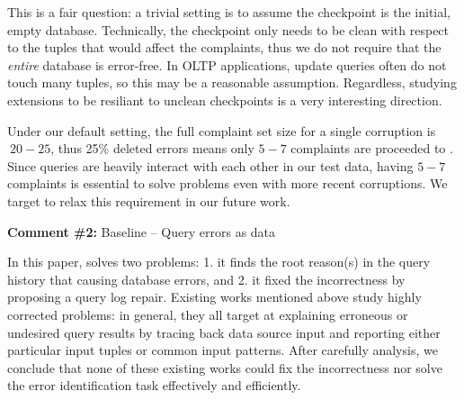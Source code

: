 \begin{quote}
\end{quote}
This is a fair question: a trivial setting is to assume the checkpoint is the initial, empty database.
Technically, the checkpoint only needs to be clean with respect to the tuples that would affect the complaints, thus we do not require that the {\it entire} database is error-free.  In OLTP applications, update queries often do not touch many tuples, so this may be a reasonable assumption.  
Regardless, studying extensions to be resiliant to unclean checkpoints is a very interesting direction.

\begin{quote}
\end{quote}

Under our default setting, the full complaint set size for a single corruption is $~20-25$, thus 
25\% deleted errors means only $5-7$ complaints are proceeded to \sys. Since queries
are heavily interact with each other in our test data, having $5-7$ complaints is essential 
to solve problems even with more recent corruptions. 
We target to relax this requirement in our future work.



\comskip

\noindent
\textbf{Comment \#2:} Baseline -- Query errors as data
\begin{quote}
\end{quote}


In this paper, \sys solves two problems: 1. it finds the root reason(s) in the
query history that causing database errors, and 2. it fixed the incorrectness
by proposing a query log repair. Existing works mentioned above study highly
corrected problems: in general, they all target at explaining erroneous or
undesired query results by tracing back data source input and reporting either
particular input tuples or common input patterns. After carefully analysis, we
conclude that none of these existing works could fix the incorrectness nor
solve the error identification task effectively and efficiently.


